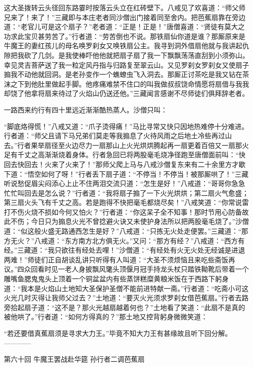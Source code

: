 \documentclass[12pt,UTF8]{ctexbook}
\begin{document}
这大圣拨转云头径回东路霎时按落云头立在红砖壁下。八戒见了欢喜道：“师父师兄来了！来了！”三藏即与本庄老者同沙僧出门接着同至舍内。把芭蕉扇靠在旁边道：“老官儿可是这个扇子？”老者道：“正是！正是！”唐僧喜道：“贤徒有莫大之功求此宝贝甚劳苦了。”行者道：“劳苦倒也不说。那铁扇仙你道是谁？那厮原来是牛魔王的妻红孩儿的母名唤罗刹女又唤铁扇公主。我寻到洞外借扇他就与我讲起仇隙把我砍了几剑。是我使棒吓他他就把扇子扇了我一下飘飘荡荡直刮到小须弥山。幸见灵吉菩萨送了我一粒定风丹指与归路复至翠云山。又见罗刹女罗刹女又使扇子搧我不动他就回洞。是老孙变作一个蟭蟟虫飞入洞去。那厮正讨茶吃是我又钻在茶沫之下到他肚里做起手脚。他疼痛难禁不住口的叫我做叔叔饶命情愿将扇借与我我却饶了他拿将扇来待过了火焰山仍送还他。”三藏闻言感谢不尽师徒们俱拜辞老者。

一路西来约行有四十里远近渐渐酷热蒸人。沙僧只叫：

“脚底烙得慌！”八戒又道：“爪子烫得痛！”马比寻常又快只因地热难停十分难进。行者道：“师父且请下马兄弟们莫走等我搧息了火待风雨之后地土冷些再过山去。”行者果举扇径至火边尽力一扇那山上火光烘烘腾起再一扇更着百倍又一扇那火足有千丈之高渐渐烧着身体。行者急回已将两股毫毛烧净径跑至唐僧面前叫：“快回去快回去！火来了火来了！”那师父爬上马与八戒沙僧复东来有二十余里方才歇下道：“悟空如何了呀！”行者丢下扇子道：“不停当！不停当！被那厮哄了！”三藏听说愁促眉尖闷添心上止不住两泪交流只道：“怎生是好！”八戒道：“哥哥你急急忙忙叫回去是怎么说？”行者道：“我将扇子搧了一下火光烘烘；第二扇火气愈盛；第三扇火头飞有千丈之高。若是跑得不快把毫毛都烧尽矣！”八戒笑道：“你常说雷打不伤火烧不损如今何又怕火？”行者道：“你这呆子全不知事！那时节用心防备故此不伤；今日只为搧息火光不曾捻避火诀又未使护身法所以把两股毫毛烧了。”沙僧道：“似这般火盛无路通西怎生是好？”八戒道：“只拣无火处走便罢。”三藏道：“那方无火？”八戒道：“东方南方北方俱无火。”又问：“那方有经？”八戒道：“西方有经。”三藏道：“我只欲往有经处去哩！”沙僧道：“有经处有火无火处无经诚是进退两难！”师徒们正自胡谈乱讲只听得有人叫道：“大圣不须烦恼且来吃些斋饭再议。”四众回看时见一老人身披飘风氅头顶偃月冠手持龙头杖只踏铁靿靴后带着一个雕嘴鱼腮鬼鬼头上顶着一个铜盆盆内有些蒸饼糕糜黄粮米饭在于西路下躬身道：“我本是火焰山土地知大圣保护圣僧不能前进特献一斋。”行者道：“吃斋小可这火光几时灭得让我师父过去？”土地道：“要灭火光须求罗刹女借芭蕉扇。”行者去路旁拾起扇子道：“这不是？那火光越扇越着何也？”土地看了笑道：“此扇不是真的被他哄了。”行者道：“如何方得真的？”那土地又控背躬身微微笑道：

“若还要借真蕉扇须是寻求大力王。”毕竟不知大力王有甚缘故且听下回分解。
------------

第六十回 牛魔王罢战赴华筵 孙行者二调芭蕉扇
\end{document}

